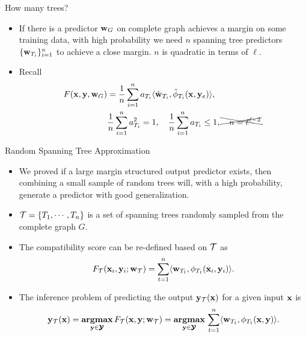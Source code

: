 \documentclass[first=dgreen,second=purple,logo=yellowexc]{aaltoslides}
\begin{document}
%
\begin{frame}{How many trees?}
	\begin{itemize}
		\item If there is a predictor $\mathbf {w}_G$ on complete graph achieves a margin on some training data, with high probability we need $n$ spanning tree predictors $\{\mathbf {w}_{T_i}\}_{i=1}^n$ to achieve a close margin. $n$ is quadratic in terms of $\ell$.
		\item Recall
		\begin{align*}
			F(\mathbf {x},\mathbf {y},\mathbf {w}_G) &= \frac{1}{n}\sum_{i = 1}^{n}a_{T_i}\langle \hat{\mathbf {w}}_{T_i}, \hat{\phi}_{T_i}(\mathbf {x},\mathbf {y}_e) \rangle,\\
			& \frac{1}{n}\sum_{i = 1}^{n}a_{T_i}^2=1, \quad 	\frac{1}{n}\sum_{i = 1}^{n}a_{T_i}\le1, \xcancel{\quad n=\ell^{\ell-2}}.
		\end{align*}
	\end{itemize}
\end{frame}


%
\begin{frame}{Random Spanning Tree Approximation}
	\begin{itemize}
		\item We proved if a large margin structured output predictor exists, then combining a small sample of random trees will, with a high probability, generate a predictor with good generalization.
		\item $\mathcal{T}=\{T_1,\cdots,T_n\}$ is a set of spanning trees randomly sampled from the complete graph $G$.
		\item The compatibility score can be re-defined based on $\mathcal{T}$ as
		\begin{align*}
			F_{\mathcal{T}}(\mathbf {x}_i,\mathbf {y}_i;\mathbf {w}_{\mathcal{T}}) = \sum_{t=1}^{n}\langle \mathbf {w}_{T_t}, \phi_{T_t}(\mathbf {x}_i,\mathbf {y}_i) \rangle.
		\end{align*}
		\item The inference problem of predicting the output $\mathbf {y}_{\mathcal{T}}(\mathbf {x})$ for a given input $\mathbf {x}$ is 
		\begin{align*}
			\mathbf {y}_{\mathcal{T}}(\mathbf {x}) = \underset{\mathbf {y}\in\pmb {\mathcal{Y}}}{\textbf{argmax}}\,F_{\mathcal{T}}(\mathbf {x},\mathbf {y};\mathbf {w}_{\mathcal{T}})=\underset{\mathbf {y}\in\pmb {\mathcal{Y}}}{\textbf{argmax}}\,\sum_{t=1}^{n}\langle \mathbf {w}_{T_t}, \phi_{T_t}(\mathbf {x},\mathbf {y}) \rangle.
		\end{align*}
	\end{itemize}
\end{frame}
\end{document}
